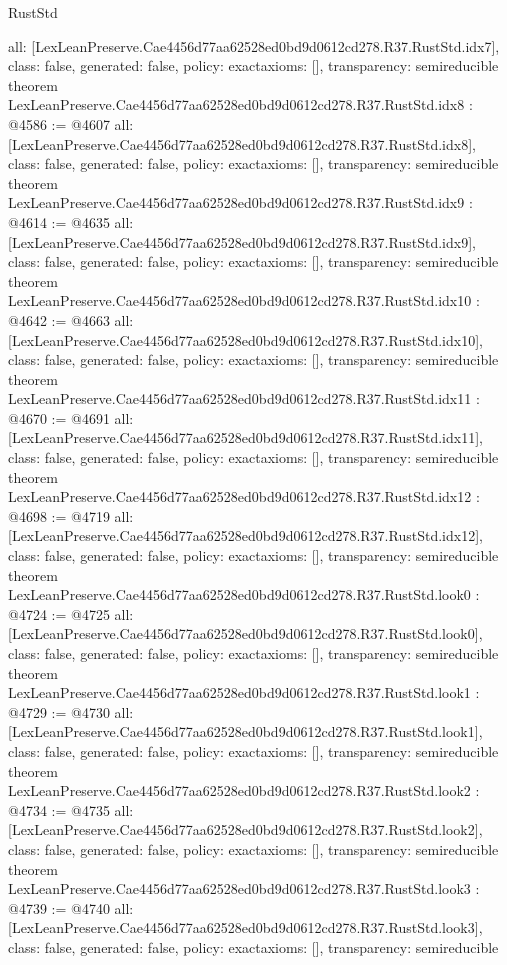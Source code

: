 \begin{lexlean}{RustStd}
\begin{coremodule}
{  all: [LexLeanPreserve.Cae4456d77aa62528ed0bd9d0612cd278.R37.RustStd.idx7],
  class: false,
  generated: false,
  policy: exact{axioms: []},
  transparency: semireducible
}
theorem LexLeanPreserve.Cae4456d77aa62528ed0bd9d0612cd278.R37.RustStd.idx8 : @4586 := @4607 {
  all: [LexLeanPreserve.Cae4456d77aa62528ed0bd9d0612cd278.R37.RustStd.idx8],
  class: false,
  generated: false,
  policy: exact{axioms: []},
  transparency: semireducible
}
theorem LexLeanPreserve.Cae4456d77aa62528ed0bd9d0612cd278.R37.RustStd.idx9 : @4614 := @4635 {
  all: [LexLeanPreserve.Cae4456d77aa62528ed0bd9d0612cd278.R37.RustStd.idx9],
  class: false,
  generated: false,
  policy: exact{axioms: []},
  transparency: semireducible
}
theorem LexLeanPreserve.Cae4456d77aa62528ed0bd9d0612cd278.R37.RustStd.idx10 : @4642 := @4663 {
  all: [LexLeanPreserve.Cae4456d77aa62528ed0bd9d0612cd278.R37.RustStd.idx10],
  class: false,
  generated: false,
  policy: exact{axioms: []},
  transparency: semireducible
}
theorem LexLeanPreserve.Cae4456d77aa62528ed0bd9d0612cd278.R37.RustStd.idx11 : @4670 := @4691 {
  all: [LexLeanPreserve.Cae4456d77aa62528ed0bd9d0612cd278.R37.RustStd.idx11],
  class: false,
  generated: false,
  policy: exact{axioms: []},
  transparency: semireducible
}
theorem LexLeanPreserve.Cae4456d77aa62528ed0bd9d0612cd278.R37.RustStd.idx12 : @4698 := @4719 {
  all: [LexLeanPreserve.Cae4456d77aa62528ed0bd9d0612cd278.R37.RustStd.idx12],
  class: false,
  generated: false,
  policy: exact{axioms: []},
  transparency: semireducible
}
theorem LexLeanPreserve.Cae4456d77aa62528ed0bd9d0612cd278.R37.RustStd.look0 : @4724 := @4725 {
  all: [LexLeanPreserve.Cae4456d77aa62528ed0bd9d0612cd278.R37.RustStd.look0],
  class: false,
  generated: false,
  policy: exact{axioms: []},
  transparency: semireducible
}
theorem LexLeanPreserve.Cae4456d77aa62528ed0bd9d0612cd278.R37.RustStd.look1 : @4729 := @4730 {
  all: [LexLeanPreserve.Cae4456d77aa62528ed0bd9d0612cd278.R37.RustStd.look1],
  class: false,
  generated: false,
  policy: exact{axioms: []},
  transparency: semireducible
}
theorem LexLeanPreserve.Cae4456d77aa62528ed0bd9d0612cd278.R37.RustStd.look2 : @4734 := @4735 {
  all: [LexLeanPreserve.Cae4456d77aa62528ed0bd9d0612cd278.R37.RustStd.look2],
  class: false,
  generated: false,
  policy: exact{axioms: []},
  transparency: semireducible
}
theorem LexLeanPreserve.Cae4456d77aa62528ed0bd9d0612cd278.R37.RustStd.look3 : @4739 := @4740 {
  all: [LexLeanPreserve.Cae4456d77aa62528ed0bd9d0612cd278.R37.RustStd.look3],
  class: false,
  generated: false,
  policy: exact{axioms: []},
  transparency: semireducible
}

\end{coremodule}
\end{lexlean}
